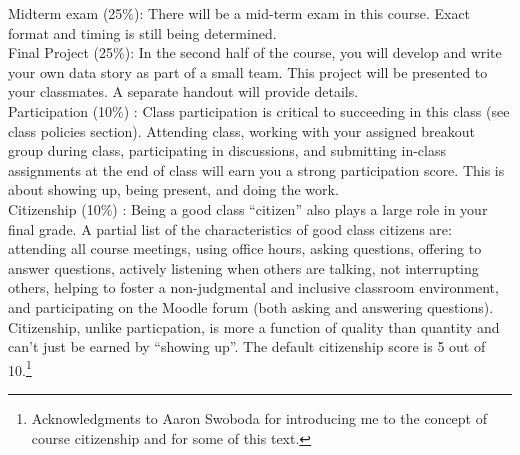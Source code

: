 \documentclass[10pt]{article}
\begin{document}
\noindent Midterm exam (25\%): There will be a mid-term exam in this course. Exact format and timing is still being determined. \\

\noindent Final Project (25\%): In the second half of the course, you will develop and write your own data story as part of a small team. This project will be presented to your classmates. A separate handout will provide details. \\

\noindent Participation (10\%) : Class participation is critical to succeeding in this class (see class policies section). Attending class, working with your assigned breakout group during class, participating in discussions, and submitting in-class assignments at the end of class will earn you a strong participation score. This is about showing up, being present, and doing the work.\\

\noindent Citizenship (10\%) : Being a good class ``citizen'' also plays a large role in your final grade. A partial list of the characteristics of good class citizens are: attending all course meetings, using office hours, asking questions, offering to answer questions, actively listening when others are talking, not interrupting others, helping to foster a non-judgmental and inclusive classroom environment, and participating on the Moodle forum (both asking and answering questions). Citizenship, unlike particpation, is more a function of quality than quantity and can't just be earned by ``showing up''. The default citizenship score is 5 out of 10.\footnote{Acknowledgments to Aaron Swoboda for introducing me to the concept of course citizenship and for some of this text.} \\
\end{document}
